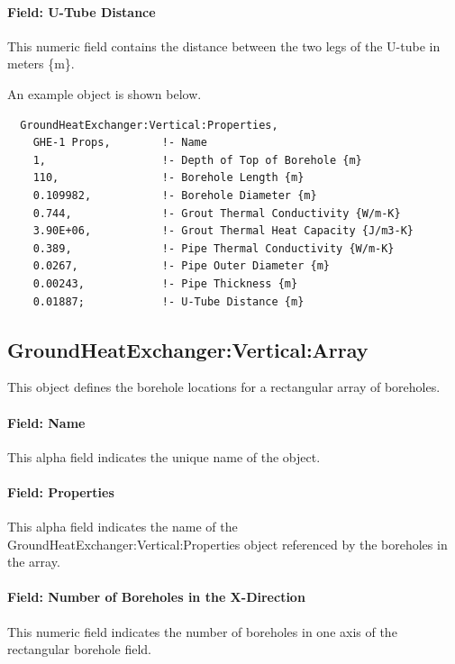 \paragraph{Field: U-Tube Distance}\label{field-u-tube-distance}

This numeric field contains the distance between the two legs of the U-tube in meters \{m\}.

An example object is shown below.

\begin{lstlisting}
  GroundHeatExchanger:Vertical:Properties,
    GHE-1 Props,        !- Name
    1,                  !- Depth of Top of Borehole {m}
    110,                !- Borehole Length {m}
    0.109982,           !- Borehole Diameter {m}
    0.744,              !- Grout Thermal Conductivity {W/m-K}
    3.90E+06,           !- Grout Thermal Heat Capacity {J/m3-K}
    0.389,              !- Pipe Thermal Conductivity {W/m-K}
    0.0267,             !- Pipe Outer Diameter {m}
    0.00243,            !- Pipe Thickness {m}
    0.01887;            !- U-Tube Distance {m}
\end{lstlisting}

\subsection{GroundHeatExchanger:Vertical:Array}\label{groundheatexchangerverticalarray}

This object defines the borehole locations for a rectangular array of boreholes.

\paragraph{Field: Name}

This alpha field indicates the unique name of the object.

\paragraph{Field: Properties}

This alpha field indicates the name of the GroundHeatExchanger:Vertical:Properties object referenced by the boreholes in the array.

\paragraph{Field: Number of Boreholes in the X-Direction}

This numeric field indicates the number of boreholes in one axis of the rectangular borehole field.

